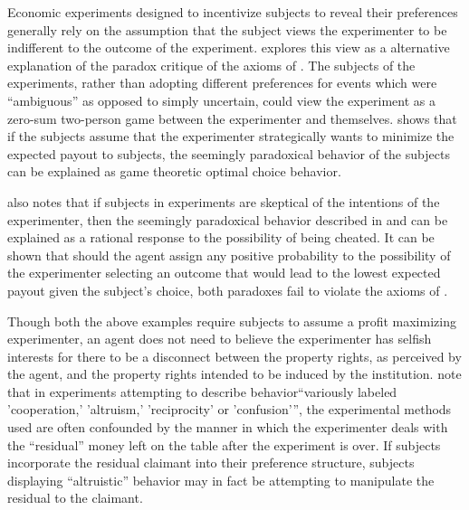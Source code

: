 Economic experiments designed to incentivize subjects to reveal their preferences generally rely on the assumption that the subject views the experimenter to be indifferent to the outcome of the experiment.
\textcite{Schneeweiss1973} explores this view as a alternative explanation of the \textcite{Ellsberg1961} paradox critique of the axioms of \textcite{Savage1954}.
The subjects of the \textcite{Ellsberg1961} experiments, rather than adopting different preferences for events which were \enquote{ambiguous} as opposed to simply uncertain, could view the experiment as a zero-sum two-person game between the experimenter and themselves.
\textcite{Schneeweiss1973} shows that if the subjects assume that the experimenter strategically wants to minimize the expected payout to subjects, the seemingly paradoxical behavior of the subjects can be explained as game theoretic optimal choice behavior.

\textcite{Kadane1992} also notes that if subjects in experiments are skeptical of the intentions of the experimenter, then the seemingly paradoxical behavior described in \textcite{Ellsberg1961} and \textcite{Allais1953} can be explained as a rational response to the possibility of being cheated.
It can be shown that should the agent assign any positive probability to the possibility of the experimenter selecting an outcome that would lead to the lowest expected payout given the subject's choice, both paradoxes fail to violate the axioms of \textcite{Savage1954}.

Though both the above examples require subjects to assume a profit maximizing experimenter, an agent does not need to believe the experimenter has selfish interests for there to be a disconnect between the property rights, as perceived by the agent, and the property rights intended to be induced by the institution.
\textcite[178]{Harrison2006} note that in experiments attempting to describe behavior\enquote{variously labeled 'cooperation,' 'altruism,' 'reciprocity' or 'confusion'}, the experimental methods used are often confounded by the manner in which the experimenter deals with the \enquote{residual} money left on the table after the experiment is over.
If subjects incorporate the residual claimant into their preference structure, subjects displaying \enquote{altruistic} behavior may in fact be attempting to manipulate the residual to the claimant.


